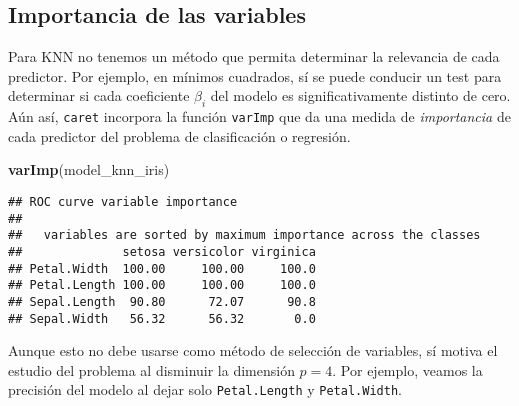 \documentclass[]{book}
\newenvironment{Shaded}{\begin{snugshade}}{\end{snugshade}}
\newcommand{\KeywordTok}[1]{\textcolor[rgb]{0.13,0.29,0.53}{\textbf{#1}}}
\newcommand{\NormalTok}[1]{#1}
\begin{document}
\hypertarget{importancia-de-las-variables}{%
\subsection{Importancia de las variables}\label{importancia-de-las-variables}}

Para KNN no tenemos un método que permita determinar la relevancia de cada predictor. Por ejemplo, en mínimos cuadrados, sí se puede conducir un test para determinar si cada coeficiente \(\beta_i\) del modelo es significativamente distinto de cero. Aún así, \texttt{caret} incorpora la función \texttt{varImp} que da una medida de \emph{importancia} de cada predictor del problema de clasificación o regresión.

\begin{Shaded}
\begin{Highlighting}[]
\KeywordTok{varImp}\NormalTok{(model_knn_iris)}
\end{Highlighting}
\end{Shaded}

\begin{verbatim}
## ROC curve variable importance
## 
##   variables are sorted by maximum importance across the classes
##              setosa versicolor virginica
## Petal.Width  100.00     100.00     100.0
## Petal.Length 100.00     100.00     100.0
## Sepal.Length  90.80      72.07      90.8
## Sepal.Width   56.32      56.32       0.0
\end{verbatim}

Aunque esto no debe usarse como método de selección de variables, sí motiva el estudio del problema al disminuir la dimensión \(p = 4\). Por ejemplo, veamos la precisión del modelo al dejar solo \texttt{Petal.Length} y \texttt{Petal.Width}.
\end{document}

